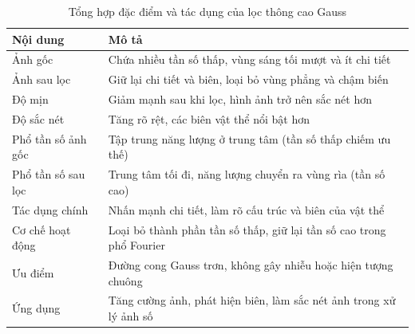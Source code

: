 \documentclass[12pt,a4paper]{report}
\numberwithin{equation}{section}
\theoremstyle{definition} %
\begin{document}
\begin{table}[H]
\centering
\caption{Tổng hợp đặc điểm và tác dụng của lọc thông cao Gauss}
\begin{tabular}{|p{4cm}|p{10cm}|}
\hline
\textbf{Nội dung} & \textbf{Mô tả} \\ \hline
Ảnh gốc & Chứa nhiều tần số thấp, vùng sáng tối mượt và ít chi tiết \\ \hline
Ảnh sau lọc & Giữ lại chi tiết và biên, loại bỏ vùng phẳng và chậm biến \\ \hline
Độ mịn & Giảm mạnh sau khi lọc, hình ảnh trở nên sắc nét hơn \\ \hline
Độ sắc nét & Tăng rõ rệt, các biên vật thể nổi bật hơn \\ \hline
Phổ tần số ảnh gốc & Tập trung năng lượng ở trung tâm (tần số thấp chiếm ưu thế) \\ \hline
Phổ tần số sau lọc & Trung tâm tối đi, năng lượng chuyển ra vùng rìa (tần số cao) \\ \hline
Tác dụng chính & Nhấn mạnh chi tiết, làm rõ cấu trúc và biên của vật thể \\ \hline
Cơ chế hoạt động & Loại bỏ thành phần tần số thấp, giữ lại tần số cao trong phổ Fourier \\ \hline
Ưu điểm & Đường cong Gauss trơn, không gây nhiễu hoặc hiện tượng chuông \\ \hline
Ứng dụng & Tăng cường ảnh, phát hiện biên, làm sắc nét ảnh trong xử lý ảnh số \\ \hline
\end{tabular}
\end{table}
\end{document}

